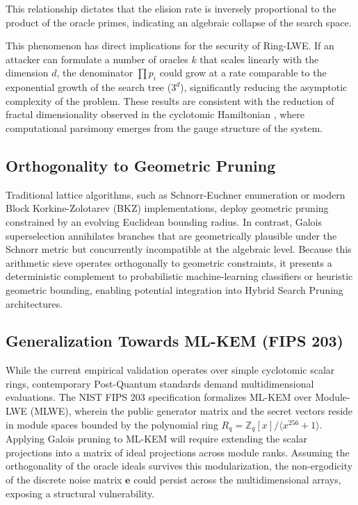 \documentclass[sn-mathphys, a4paper]{sn-jnl}
\begin{document}
This relationship dictates that the elision rate is inversely proportional to the product of the oracle primes, indicating an algebraic collapse of the search space.

This phenomenon has direct implications for the security of Ring-LWE. If an attacker can formulate a number of oracles $k$ that scales linearly with the dimension $d$, the denominator $\prod p_i$ could grow at a rate comparable to the exponential growth of the search tree ($3^d$), significantly reducing the asymptotic complexity of the problem. These results are consistent with the reduction of fractal dimensionality observed in the cyclotomic Hamiltonian \cite{peinador2026}, where computational parsimony emerges from the gauge structure of the system.

\subsection{Orthogonality to Geometric Pruning}

Traditional lattice algorithms, such as Schnorr-Euchner enumeration or modern Block Korkine-Zolotarev (BKZ) implementations, deploy geometric pruning constrained by an evolving Euclidean bounding radius. In contrast, Galois superselection annihilates branches that are geometrically plausible under the Schnorr metric but concurrently incompatible at the algebraic level. Because this arithmetic sieve operates orthogonally to geometric constraints, it presents a deterministic complement to probabilistic machine-learning classifiers or heuristic geometric bounding, enabling potential integration into Hybrid Search Pruning architectures.

\subsection{Generalization Towards ML-KEM (FIPS 203)}

While the current empirical validation operates over simple cyclotomic scalar rings, contemporary Post-Quantum standards demand multidimensional evaluations. The NIST FIPS 203 specification formalizes ML-KEM over Module-LWE (MLWE), wherein the public generator matrix and the secret vectors reside in module spaces bounded by the polynomial ring $R_q = \mathbb{Z}_q[x]/\langle x^{256} + 1 \rangle$. Applying Galois pruning to ML-KEM will require extending the scalar projections into a matrix of ideal projections across module ranks. Assuming the orthogonality of the oracle ideals survives this modularization, the non-ergodicity of the discrete noise matrix $\mathbf{e}$ could persist across the multidimensional arrays, exposing a structural vulnerability.
\end{document}
